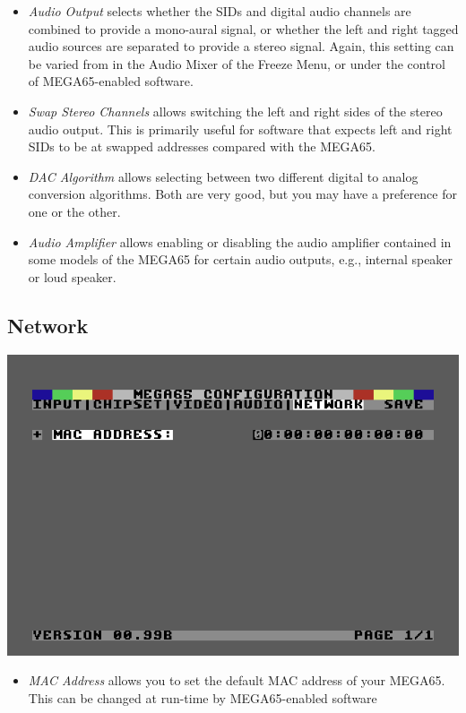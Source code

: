 \begin{itemize}
  \item{\em Audio Output} selects whether the SIDs and digital audio
    channels are combined to provide a mono-aural signal, or whether
    the left and right tagged audio sources are separated to provide a
    stereo signal. Again, this setting can be varied from in the Audio
    Mixer of the Freeze Menu, or under the control of MEGA65-enabled
    software.
  \item{\em Swap Stereo Channels} allows switching the left and right
    sides of the stereo audio output. This is primarily useful for
    software that expects left and right SIDs to be at swapped
    addresses compared with the MEGA65.
  \item{\em DAC Algorithm} allows selecting between two different
    digital to analog conversion algorithms.  Both are very good,
    but you may have a preference for one or the other.
  \item{\em Audio Amplifier} allows enabling or disabling the audio
    amplifier contained in some models of the MEGA65 for
    certain audio outputs, e.g., internal speaker or loud speaker.
\end{itemize}

\subsection{Network}

\includegraphics[width=\linewidth]{images/ss-m65config-5.png}

\begin{itemize}
  \item{\em MAC Address} allows you to set the default MAC address of your
    MEGA65.  This can be changed at run-time by MEGA65-enabled
    software
\end{itemize}
